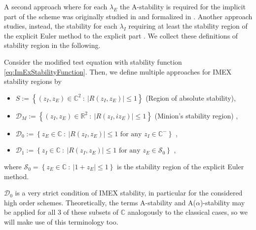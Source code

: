 A second approach where for each $\lambda_E$ the A-stability is required for the implicit part of the scheme was originally studied in \cite{zhong1996additive,caflisch1997uniformly} and formalized in \cite{liotta2000central}. Another approach studies, instead, the stability for each $\lambda_I$ requiring at least the stability region of the explicit Euler method to the explicit part \cite{Hundsdorfer}.
We collect these definitions of stability region in the following.
\begin{definition}
	Consider the modified test equation with stability function \eqref{eq:ImExStabilityFunction}. Then, we define multiple approaches for IMEX stability regions by
	\begin{itemize}
		\item $S:=\left\{(z_I,z_E)\in \mathbb{C}^2 \ :\ \lvert{R(z_I,z_E)}\rvert\le1\right\}$ (Region of absolute stability),
	\item  $\mathcal{D}_M:= \left\{(z_I,z_E)\in \mathbb{R}^2 \ :\ \lvert{R(z_I,iz_E)}\rvert\le1\right\}$  (Minion's stability region) \cite{minion2003dec}, 
	\item  $\mathcal{D}_0:=\left\{z_E \in \mathbb{C}\ :\ \lvert{R(z_I,z_E)}\rvert \le 1 \textrm{ for any } z_I \in \mathbb{C}^- \right\}$ \cite{liotta2000central},
	\item $\mathcal{D}_1:=\left\{z_I \in \mathbb{C}\ :\ \lvert{R(z_I,z_E)}\rvert \le 1 \textrm{ for any } z_E \in \mathcal{S}_0 \right\}$ \cite{Hundsdorfer},
	\end{itemize}
	where $\mathcal{S}_0=\left\{z_E \in \mathbb{C}\ :\ \lvert 1+z_E\rvert \le 1 \right\}$ is the stability region of the explicit Euler method. 
\end{definition}
$\mathcal D_0$ is a very strict condition of IMEX stability, in particular for the considered high order schemes. 
Theoretically, the terms A-stability and A($\alpha$)-stability may be applied for all 3 of these subsets of $\mathbb{C}$ analogously to the classical cases, so we will make use of this terminology too. 

